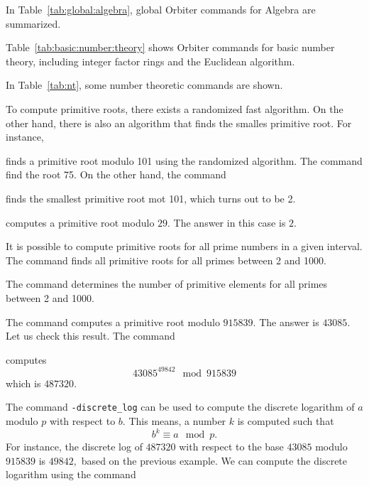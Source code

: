 In Table~\ref{tab:global:algebra},  
global Orbiter commands for Algebra are summarized.


\bigskip


Table~\ref{tab:basic:number:theory} 
shows Orbiter commands for basic number theory, 
including integer factor rings and 
the Euclidean algorithm.

\bigskip

In Table~\ref{tab:nt}, 
some number theoretic commands are shown.

\bigskip

To compute primitive roots, 
there exists a randomized fast algorithm. 
On the other hand, there is also 
an algorithm that finds the smalles primitive root. 
For instance,  



finds a primitive root modulo 101 
using the randomized algorithm. 
The command find the root 75.
On the other hand, the command


finds the smallest primitive root mot 101, 
which turns out to be 2. 





computes a primitive root modulo $29$. 
The answer in this case is $2.$

\bigskip


It is possible to compute primitive roots 
for all prime numbers in a given interval. 
The command
finds all primitive roots for all primes between 2 and 1000.

\bigskip

The command
determines the number of primitive elements 
for all primes between 2 and 1000.


\bigskip


The command
computes a primitive root modulo $915839$. 
The answer is $43085$.
Let us check this result.
The command 


computes 
$$
43085^{49842} \mod 915839
$$
which is $487320$.

\bigskip

The command \verb'-discrete_log' can be used to compute 
the discrete logarithm of $a$ modulo $p$ with respect to $b$. 
This means, a number $k$ is computed such that 
$$
b^k \equiv a \mod p.
$$
For instance, the discrete log of $487320$ with respect to 
the base $43085$ modulo $915839$ is $49842,$ 
based on the previous example. 
We can compute the discrete logarithm 
using the command 

